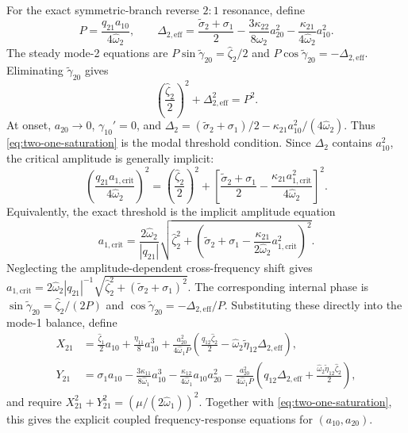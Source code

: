 \documentclass[11pt]{article}
\begin{document}
For the exact symmetric-branch reverse $2{:}1$ resonance, define
\[
P=\frac{q_{21}a_{10}}{4\hat{\omega}_2},\qquad
\Delta_{2,\mathrm{eff}}=\frac{\tilde{\sigma}_2+\sigma_1}{2}-\frac{3\kappa_{22}}{8\hat{\omega}_2}a_{20}^2-\frac{\kappa_{21}}{4\hat{\omega}_2}a_{10}^2.
\]
The steady mode-2 equations are $P\sin\tilde{\gamma}_{20}=\hat{\zeta}_2/2$ and $P\cos\tilde{\gamma}_{20}=-\Delta_{2,\mathrm{eff}}$. Eliminating $\tilde{\gamma}_{20}$ gives
\begin{equation}\label{eq:two-one-saturation}
\left(\frac{\hat{\zeta}_2}{2}\right)^2+\Delta_{2,\mathrm{eff}}^2=P^2.
\end{equation}
At onset, $a_{20}\to0$, $\gamma_{10}'=0$, and $\Delta_2=(\tilde{\sigma}_2+\sigma_1)/2-\kappa_{21}a_{10}^2/(4\hat{\omega}_2)$. Thus \eqref{eq:two-one-saturation} is the modal threshold condition. Since $\Delta_2$ contains $a_{10}^2$, the critical amplitude is generally implicit:
\[
\left(\frac{q_{21}a_{1,\mathrm{crit}}}{4\hat{\omega}_2}\right)^2=\left(\frac{\hat{\zeta}_2}{2}\right)^2+\left[\frac{\tilde{\sigma}_2+\sigma_1}{2}-\frac{\kappa_{21}a_{1,\mathrm{crit}}^2}{4\hat{\omega}_2}\right]^2.
\]
Equivalently, the exact threshold is the implicit amplitude equation
\[
a_{1,\mathrm{crit}}=\frac{2\hat{\omega}_2}{|q_{21}|}\sqrt{\hat{\zeta}_2^2+\left(\tilde{\sigma}_2+\sigma_1-\frac{\kappa_{21}}{2\hat{\omega}_2}a_{1,\mathrm{crit}}^2\right)^2}.
\]
Neglecting the amplitude-dependent cross-frequency shift gives $a_{1,\mathrm{crit}}=2\hat{\omega}_2|q_{21}|^{-1}\sqrt{\hat{\zeta}_2^2+(\tilde{\sigma}_2+\sigma_1)^2}$. The corresponding internal phase is $\sin\tilde{\gamma}_{20}=\hat{\zeta}_2/(2P)$ and $\cos\tilde{\gamma}_{20}=-\Delta_{2,\mathrm{eff}}/P$. Substituting these directly into the mode-1 balance, define
\begin{align*}
X_{21}&=\frac{\hat{\zeta}_1}{2}a_{10}+\frac{\eta_{11}}{8}a_{10}^3+\frac{a_{20}^2}{4\hat{\omega}_1P}\left(\frac{q_{12}\hat{\zeta}_2}{2}-\hat{\omega}_2\tilde{\eta}_{12}\Delta_{2,\mathrm{eff}}\right),\\
Y_{21}&=\sigma_1a_{10}-\frac{3\kappa_{11}}{8\hat{\omega}_1}a_{10}^3-\frac{\kappa_{12}}{4\hat{\omega}_1}a_{10}a_{20}^2-\frac{a_{20}^2}{4\hat{\omega}_1P}\left(q_{12}\Delta_{2,\mathrm{eff}}+\frac{\hat{\omega}_2\tilde{\eta}_{12}\hat{\zeta}_2}{2}\right),
\end{align*}
and require $X_{21}^2+Y_{21}^2=(\mu/(2\hat{\omega}_1))^2$. Together with \eqref{eq:two-one-saturation}, this gives the explicit coupled frequency-response equations for $(a_{10},a_{20})$.
\end{document}

